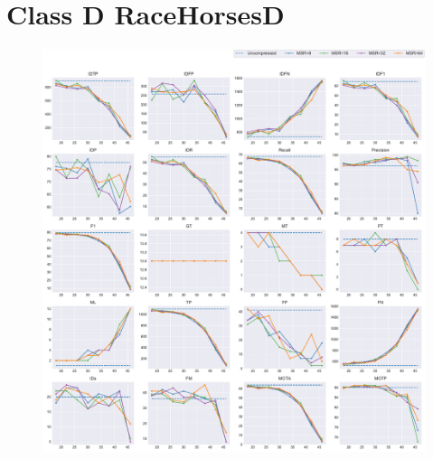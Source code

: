 
\section{Class D RaceHorsesD}
\label{sec:appendix/RaceHorsesD_all}


\begin{figure}[!htbp]
\centering
\includegraphics[width=1.0\linewidth]{img/appendix/RaceHorsesD_all_multiplots_qp.pdf}
\caption[Result of all object classes in Class D RaceHorsesD with Horizontal Axis of QP]{}
\label{fig:RaceHorsesD_all_qp}
\end{figure}

